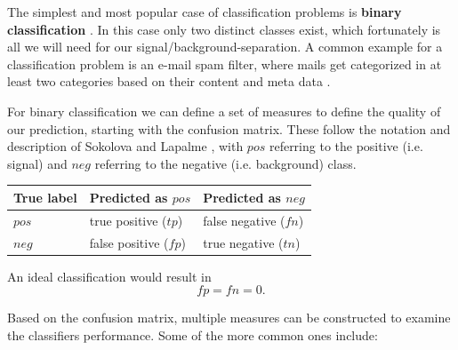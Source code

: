 The simplest and most popular case of classification problems
is \textbf{binary classification} \cite{sokolova2009systematic}.
In this case only two distinct
classes exist, which fortunately is all we will need for
our signal/background-separation.
A common example for a classification problem is an e-mail spam filter,
where mails get categorized in at least two categories based
on their content and meta data \cite{DBLP:journals/corr/cs-CL-0006013}.

For binary classification we can define a set of measures
to define the quality of our prediction, starting with the confusion matrix.
These follow the notation and description of
Sokolova and Lapalme \cite{sokolova2009systematic},
with $pos$ referring to the positive (i.e. signal)
and $neg$ referring to the negative (i.e. background) class.

\begin{center}
    \begin{tabular}{ | l | l | l |}
    \hline
    True label & Predicted as $pos$ & Predicted as $neg$ \\
    \hline
    $pos$ & true positive ($tp$) & false negative ($fn$) \\ 
    \hline
    $neg$ & false positive ($fp$) & true negative ($tn$) \\
    \hline
    \end{tabular}
    \label{tab:confusion}
\end{center}

An ideal classification would result in
\begin{equation*}
  fp = fn = 0.
\end{equation*}

Based on the confusion matrix, multiple measures 
can be constructed to examine the classifiers performance.
Some of the more common ones include:


